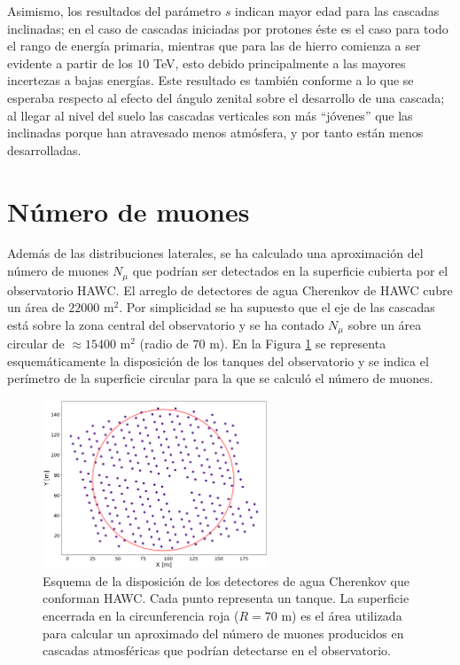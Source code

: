 	Asimismo, los resultados del par\'ametro $s$ indican mayor edad para las cascadas inclinadas; en el caso de cascadas iniciadas por protones \'este es el caso para todo el rango de energ\'ia primaria, mientras que para las de hierro comienza a ser evidente a partir de los $10$ TeV, esto debido principalmente a las mayores incertezas a bajas energ\'ias. Este resultado es tambi\'en conforme a lo que se esperaba respecto al efecto del \'angulo zenital sobre el desarrollo de una cascada; al llegar al nivel del suelo las cascadas verticales son m\'as ``j\'ovenes'' que las inclinadas porque han atravesado menos atm\'osfera, y por tanto est\'an menos desarrolladas. 

\section{N\'umero de muones}
Adem\'as de las distribuciones laterales, se ha calculado una aproximaci\'on del n\'umero de muones $N_{\mu}$ que podr\'ian ser detectados en la superficie cubierta por el observatorio HAWC. El arreglo de detectores de agua Cherenkov de HAWC cubre un \'area de $22000$ m$^2$. Por simplicidad se ha supuesto que el eje de las cascadas est\'a sobre la zona central del observatorio y se ha contado $N_{\mu}$ sobre un \'area circular de $\approx 15400$ m$^2$ (radio de $70$ m). En la Figura \ref{fig:hawc} se representa esquem\'aticamente la disposici\'on de los tanques del observatorio y se indica el per\'imetro de la superficie circular para la que se calcul\'o el n\'umero de muones.\\
	\begin{figure} []
	\centering
	\includegraphics[width=0.6\textwidth]{Figuras/HAWC_array}
	\caption{Esquema de la disposici\'on de los detectores de agua Cherenkov que conforman HAWC. Cada punto representa un tanque. La superficie encerrada en la circunferencia roja ($R=70$ m) es el \'area utilizada para calcular un aproximado del n\'umero de muones producidos en cascadas atmosf\'ericas que podr\'ian detectarse en el observatorio.}
	\label{fig:hawc}
	\end{figure}

